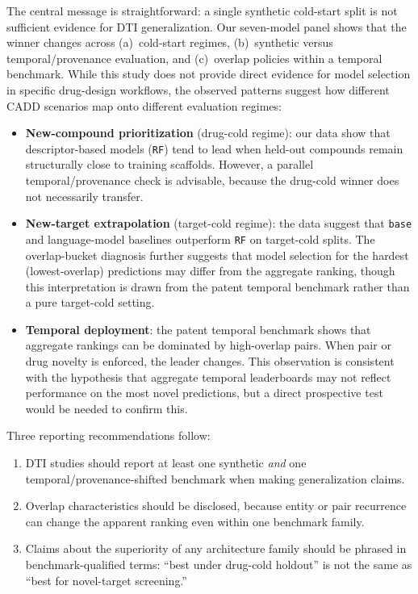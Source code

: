 \documentclass[referee,pdflatex,sn-basic,Numbered]{sn-jnl}
\begin{document}
The central message is straightforward: a single synthetic cold-start split is not sufficient evidence for DTI generalization. Our seven-model panel shows that the winner changes across (a)~cold-start regimes, (b)~synthetic versus temporal/provenance evaluation, and (c)~overlap policies within a temporal benchmark. While this study does not provide direct evidence for model selection in specific drug-design workflows, the observed patterns suggest how different CADD scenarios map onto different evaluation regimes:

\begin{itemize}
    \item \textbf{New-compound prioritization} (drug-cold regime): our data show that descriptor-based models (\texttt{RF}) tend to lead when held-out compounds remain structurally close to training scaffolds. However, a parallel temporal/provenance check is advisable, because the drug-cold winner does not necessarily transfer.
    \item \textbf{New-target extrapolation} (target-cold regime): the data suggest that \texttt{base} and language-model baselines outperform \texttt{RF} on target-cold splits. The overlap-bucket diagnosis further suggests that model selection for the hardest (lowest-overlap) predictions may differ from the aggregate ranking, though this interpretation is drawn from the patent temporal benchmark rather than a pure target-cold setting.
    \item \textbf{Temporal deployment}: the patent temporal benchmark shows that aggregate rankings can be dominated by high-overlap pairs. When pair or drug novelty is enforced, the leader changes. This observation is consistent with the hypothesis that aggregate temporal leaderboards may not reflect performance on the most novel predictions, but a direct prospective test would be needed to confirm this.
\end{itemize}

Three reporting recommendations follow:
\begin{enumerate}
    \item DTI studies should report at least one synthetic \emph{and} one temporal/provenance-shifted benchmark when making generalization claims.
    \item Overlap characteristics should be disclosed, because entity or pair recurrence can change the apparent ranking even within one benchmark family.
    \item Claims about the superiority of any architecture family should be phrased in benchmark-qualified terms: ``best under drug-cold holdout'' is not the same as ``best for novel-target screening.''
\end{enumerate}
\end{document}
